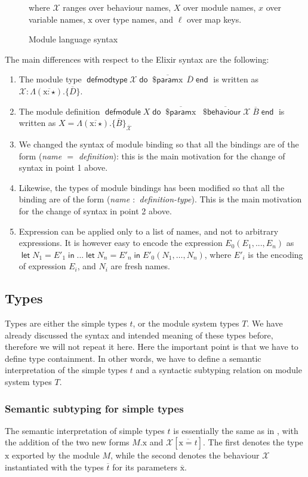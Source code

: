 \documentclass[a4paper,10pt]{article}
\DeclareMathOperator{\kwdefmt}{\textsf{defmodtype}}
\DeclareMathOperator{\kwend}{\textsf{end}}
\DeclareMathOperator{\kwdo}{\textsf{do}}
\DeclareMathOperator{\kwbvr}{\textsf{\$behaviour}}
\DeclareMathOperator{\kwlet}{\textsf{let}}
\DeclareMathOperator{\kwin}{\textsf{in}}
\DeclareMathOperator{\kwprm}{\textsf{\$param}}
\DeclareMathOperator{\kwdefm}{\textsf{defmodule}}
\newcommand{\tx}{\textrm{x}}
\newcommand{\BX}{\ensuremath{\mathcal{X}}}
\begin{document}
\begin{figure}
 where $\BX$ ranges over behaviour names, $X$ over module names, $x$ over variable names, $\tx$ over type names, and $\ell$ over map keys. 
  \caption{Module language syntax}\label{fig:modulelangsyntax}
\end{figure}



The main differences with respect to the Elixir syntax are the following:

\begin{enumerate}
  \item The module type $\kwdefmt \BX\kwdo \overline{\kwprm \tx}\, \overline{D} \kwend$ is written as $\BX: \Lambda(\overline{\tx:\star}).\{\overline{D}\}$.
  \item The module definition $\kwdefm X \kwdo \overline{\kwprm \tx}\; \overline{\kwbvr \mathcal{X}}\; \overline{B} \kwend$ is written as $X = \Lambda(\overline{\tx:\star}).\{\overline{B}\}_{\overline{\mathcal{X}}}$
  \item We changed the syntax of module binding so that all the bindings are of the form (\emph{name $=$ definition}): this is the main motivation for the change of syntax in point 1 above.
  \item Likewise, the types of module bindings has been modified so that all the binding are of the form (\emph{name $:$ definition-type}). This is the main motivation for the change of syntax in point 2 above.
  \item Expression can be applied only to a list of names, and not to arbitrary expressions. It is however easy to encode the expression $E_0(E_1,...,E_n)$ as $\kwlet N_1 = E'_1 \kwin ... \kwlet N_n=E'_n\kwin E'_0(N_1,\dots,N_n)$, where $E'_i$ is the encoding of expression $E_i$, and $N_i$ are fresh names.  
\end{enumerate}

\subsection{Types}

Types are either the simple types $t$, or the module system types $T$. We have already discussed the syntax and intended meaning of these types before, therefore we will not repeat it here. Here the important point is that we have to define type containment. In other words, we have to define a semantic interpretation of the simple types $t$ and a syntactic subtyping relation on module system types $T$. 

\subsubsection{Semantic subtyping for simple types}
The semantic interpretation of simple types $t$ is essentially the same as in \cite{CDV24,CD25}, with the addition of the two new forms $M.\tx$ and $\BX[\overline{\tx=t}]$. The first denotes the type $\tx$ exported by the module $M$, while the second denotes the behaviour $\BX$ instantiated with the types $\overline{t}$ for its parameters $\overline{\tx}$.
\end{document}
